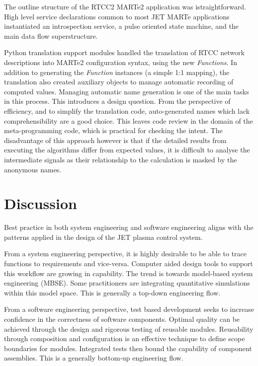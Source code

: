 \documentclass[preprint,12pt]{elsarticle}
\begin{document}
The outline structure of the RTCC2 MARTe2 application was istraightforward.
High level service declarations common to most JET MARTe applications
instantiated an introspection service, a pulse oriented state machine, 
and the main data flow superstructure.

Python translation support modules handled the translation of RTCC network 
descriptions into MARTe2 configuration syntax, using the new {\em Functions}.
In addition to generating the {\em Function} instances (a simple 1:1 mapping),
the translation also created auxiliary objects to manage automatic
recording of computed values.  Managing automatic name generation is one
of the main tasks in this process.  This introduces a design question.  From
the perspective of efficiency, and to simplify the translation code, 
auto-generated names which lack comprehensibility are a good choice. 
This leaves code review in the domain of the meta-programming code, 
which is practical for checking the intent.  The disadvantage of this
approach however is that if the detailed results from executing the 
algorithms differ from expected values, it is difficult to analyse
the intermediate signals as their relationship to the calculation is
masked by the anonymous names.


\section{Discussion}

Best practice in both system engineering and software engineering 
aligns with the patterns applied in the design of the JET plasma control system.

From a system engineering perspective, it is highly desirable to be
able to trace functions to requirements and vice-versa. Computer
aided design tools to support this workflow are growing in capability.
The trend is towards model-based system engineering (MBSE).  Some
practitioners are integrating quantitative simulations within this
model space. This is generally a top-down engineering flow.

From a software engineering perspective, test based development seeks
to increase confidence in the correctness of software components.
Optimal quality can be achieved through the design and rigorous testing
of reusable modules.  Reusability through composition and configuration
is an effective technique to define scope boundaries for modules.
Integrated tests then bound the capability of component assemblies.
This is a generally bottom-up engineering flow.
\end{document}
